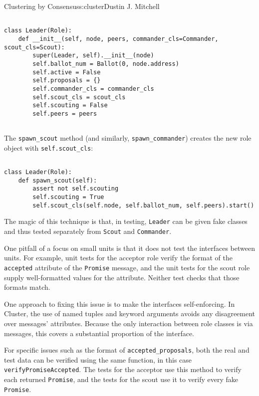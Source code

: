\begin{aosachapter}{Clustering by Consensus}{s:cluster}{Dustin J. Mitchell}
\begin{verbatim}

class Leader(Role):
    def __init__(self, node, peers, commander_cls=Commander, scout_cls=Scout):
        super(Leader, self).__init__(node)
        self.ballot_num = Ballot(0, node.address)
        self.active = False
        self.proposals = {}
        self.commander_cls = commander_cls
        self.scout_cls = scout_cls
        self.scouting = False
        self.peers = peers
    
\end{verbatim}

The \texttt{spawn\_scout} method (and similarly,
\texttt{spawn\_commander}) creates the new role object with
\texttt{self.scout\_cls}:

\begin{verbatim}

class Leader(Role):
    def spawn_scout(self):
        assert not self.scouting
        self.scouting = True
        self.scout_cls(self.node, self.ballot_num, self.peers).start()
\end{verbatim}

The magic of this technique is that, in testing, \texttt{Leader} can be
given fake classes and thus tested separately from \texttt{Scout} and
\texttt{Commander}.

\label{interface-correctness}

One pitfall of a focus on small units is that it does not test the
interfaces between units. For example, unit tests for the acceptor role
verify the format of the \texttt{accepted} attribute of the
\texttt{Promise} message, and the unit tests for the scout role supply
well-formatted values for the attribute. Neither test checks that those
formats match.

One approach to fixing this issue is to make the interfaces
self-enforcing. In Cluster, the use of named tuples and keyword
arguments avoids any disagreement over messages' attributes. Because the
only interaction between role classes is via messages, this covers a
substantial proportion of the interface.

For specific issues such as the format of \texttt{accepted\_proposals},
both the real and test data can be verified using the same function, in
this case \texttt{verifyPromiseAccepted}. The tests for the acceptor use
this method to verify each returned \texttt{Promise}, and the tests for
the scout use it to verify every fake \texttt{Promise}.


\end{aosachapter}
